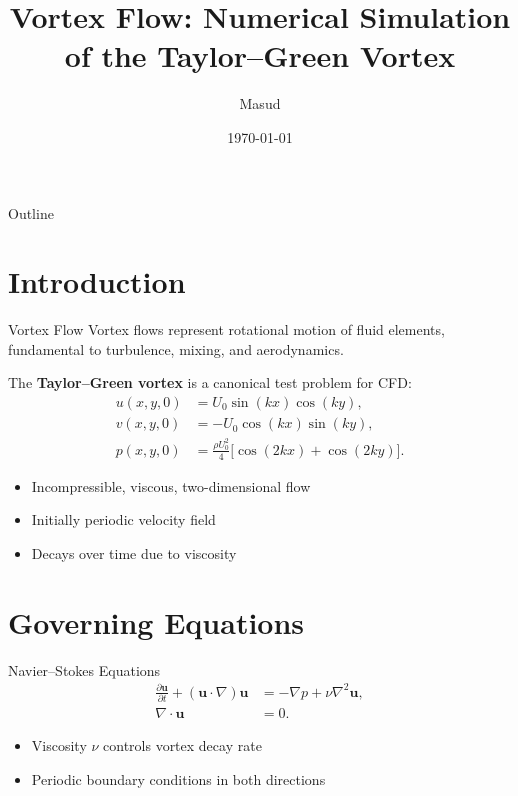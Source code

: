 \documentclass{beamer}
\title{Vortex Flow: Numerical Simulation of the Taylor--Green Vortex}
\author{Masud}
\date{\today}
\begin{document}
\begin{frame}
\titlepage
\end{frame}

\begin{frame}{Outline}
\tableofcontents
\end{frame}

\section{Introduction}
\begin{frame}{Vortex Flow}
Vortex flows represent rotational motion of fluid elements, fundamental to turbulence, mixing, and aerodynamics.

The \textbf{Taylor--Green vortex} is a canonical test problem for CFD:
\[
\begin{aligned}
u(x,y,0) &= U_0 \sin(kx) \cos(ky), \\
v(x,y,0) &= -U_0 \cos(kx) \sin(ky), \\
p(x,y,0) &= \frac{\rho U_0^2}{4} \big[\cos(2kx) + \cos(2ky)\big].
\end{aligned}
\]

\begin{itemize}
    \item Incompressible, viscous, two-dimensional flow
    \item Initially periodic velocity field
    \item Decays over time due to viscosity
\end{itemize}
\end{frame}

\section{Governing Equations}
\begin{frame}{Navier--Stokes Equations}
\[
\begin{aligned}
\frac{\partial \mathbf{u}}{\partial t} + (\mathbf{u} \cdot \nabla)\mathbf{u} &= -\nabla p + \nu \nabla^2 \mathbf{u}, \\
\nabla \cdot \mathbf{u} &= 0.
\end{aligned}
\]

\begin{itemize}
    \item Viscosity $\nu$ controls vortex decay rate
    \item Periodic boundary conditions in both directions
\end{itemize}
\end{frame}
\end{document}
